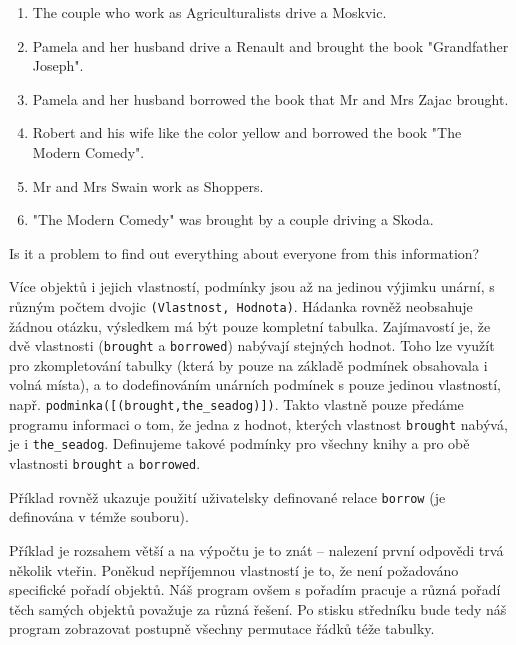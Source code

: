 \documentclass[11pt]{article} %
\begin{document}
\begin{framed}
\begin{enumerate}
\item The couple who work as Agriculturalists drive a Moskvic.
\item Pamela and her husband drive a Renault and brought the book "Grandfather Joseph".
\item Pamela and her husband borrowed the book that Mr and Mrs Zajac brought.
\item Robert and his wife like the color yellow and borrowed the book "The Modern Comedy".
\item Mr and Mrs Swain work as Shoppers.
\item "The Modern Comedy" was brought by a couple driving a Skoda.
\end{enumerate}
Is it a problem to find out everything about everyone from this information?
\end{framed}
Více objektů i jejich vlastností, podmínky jsou až na jedinou výjimku unární, s různým počtem dvojic \texttt{(Vlastnost, Hodnota)}. Hádanka rovněž neobsahuje žádnou otázku, výsledkem má být pouze kompletní tabulka. Zajímavostí je, že dvě vlastnosti (\texttt{brought} a \texttt{borrowed}) nabývají stejných hodnot. Toho lze využít pro zkompletování tabulky (která by pouze na základě podmínek obsahovala i volná místa), a to dodefinováním unárních podmínek s pouze jedinou vlastností, např. \texttt{podminka([(brought,the\_seadog)])}. Takto vlastně pouze předáme programu informaci o tom, že jedna z hodnot, kterých vlastnost \texttt{brought} nabývá, je i \texttt{the\_seadog}. Definujeme takové podmínky pro všechny knihy a pro obě vlastnosti \texttt{brought} a \texttt{borrowed}.

Příklad rovněž ukazuje použití uživatelsky definované relace \texttt{borrow} (je definována v témže souboru). 

Příklad je rozsahem větší a na výpočtu je to znát -- nalezení první odpovědi trvá několik vteřin. Poněkud nepříjemnou vlastností je to, že není požadováno specifické pořadí objektů. Náš program ovšem s pořadím pracuje a různá pořadí těch samých objektů považuje za různá řešení. Po stisku středníku bude tedy náš program zobrazovat postupně všechny permutace řádků téže tabulky.
\end{document}
